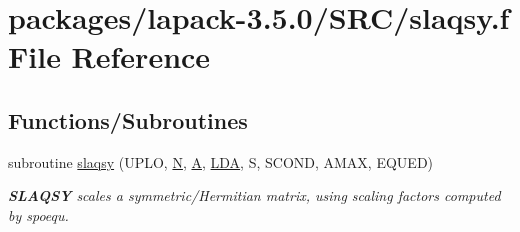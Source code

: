\hypertarget{slaqsy_8f}{}\section{packages/lapack-\/3.5.0/\+S\+R\+C/slaqsy.f File Reference}
\label{slaqsy_8f}
\subsection*{Functions/\+Subroutines}
\begin{DoxyCompactItemize}
\item 
subroutine \hyperlink{group__realSYauxiliary_gae8aee61b66e5c43af072432c98e8024a}{slaqsy} (U\+P\+L\+O, \hyperlink{polmisc_8c_a0240ac851181b84ac374872dc5434ee4}{N}, \hyperlink{classA}{A}, \hyperlink{example__user_8c_ae946da542ce0db94dced19b2ecefd1aa}{L\+D\+A}, S, S\+C\+O\+N\+D, A\+M\+A\+X, E\+Q\+U\+E\+D)
\begin{DoxyCompactList}\small\item\em {\bfseries S\+L\+A\+Q\+S\+Y} scales a symmetric/\+Hermitian matrix, using scaling factors computed by spoequ. \end{DoxyCompactList}\end{DoxyCompactItemize}

